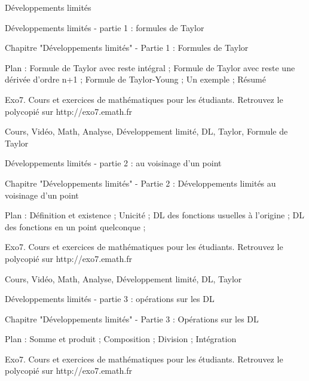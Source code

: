 
   Développements limités

Développements limités - partie 1 : formules de Taylor



Chapitre "Développements limités" - Partie 1 : Formules de Taylor

Plan : Formule de Taylor avec reste intégral ; Formule de Taylor avec reste
une dérivée d'ordre n+1 ; Formule de Taylor-Young ; Un exemple ; Résumé

Exo7. Cours et exercices de mathématiques pour les étudiants.
Retrouvez le polycopié sur http://exo7.emath.fr


Cours, Vidéo, Math, Analyse, Développement limité, DL, Taylor, Formule de Taylor




Développements limités - partie 2 : au voisinage d'un point



Chapitre "Développements limités" - Partie 2 : Développements limités au voisinage d'un point

Plan : Définition et existence ; Unicité ; DL des fonctions usuelles à l'origine ; 
DL des fonctions en un point quelconque ; 

Exo7. Cours et exercices de mathématiques pour les étudiants.
Retrouvez le polycopié sur http://exo7.emath.fr


Cours, Vidéo, Math, Analyse, Développement limité, DL, Taylor






Développements limités - partie 3 : opérations sur les DL



Chapitre "Développements limités" - Partie 3 : Opérations sur les DL

Plan : Somme et produit ; Composition ; Division ; Intégration

Exo7. Cours et exercices de mathématiques pour les étudiants.
Retrouvez le polycopié sur http://exo7.emath.fr

